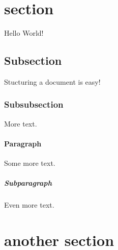 \documentclass{article}
\begin{document}
	\section{section}
	Hello World!
	\subsection{Subsection}
	Stucturing a document is easy!
	\subsubsection{Subsubsection}
	More text.
	\paragraph{Paragraph}
	Some more text.
	\subparagraph{Subparagraph}
	Even more text.
	\section{another section}
\end{document}
